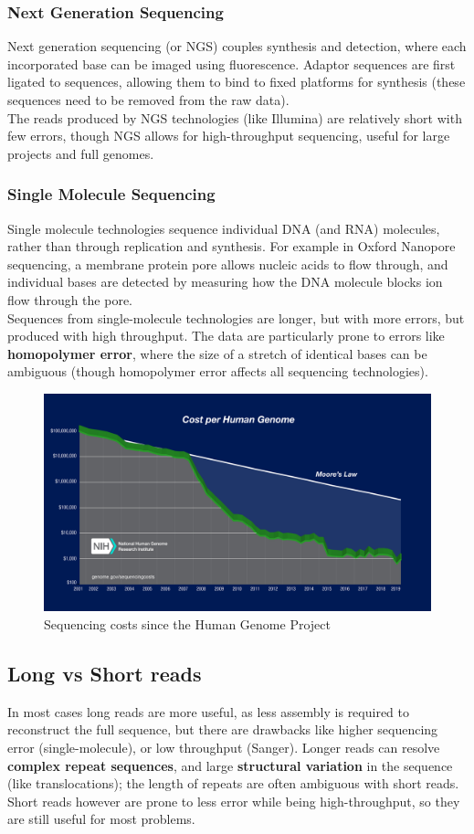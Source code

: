 \documentclass[12pt]{article}
\begin{document}
\subsubsection{Next Generation Sequencing}
Next generation sequencing (or NGS) couples synthesis and detection, where each incorporated base can be imaged using fluorescence. Adaptor sequences are first ligated to sequences, allowing them to bind to fixed platforms for synthesis (these sequences need to be removed from the raw data).\\[10pt]
The reads produced by NGS technologies (like Illumina) are relatively short with few errors, though NGS allows for high-throughput sequencing, useful for large projects and full genomes.

\subsubsection{Single Molecule Sequencing}
Single molecule technologies sequence individual DNA (and RNA) molecules, rather than through replication and synthesis. For example in Oxford Nanopore sequencing, a membrane protein pore allows nucleic acids to flow through, and individual bases are detected by measuring how the DNA molecule blocks ion flow through the pore.\\[10pt]
Sequences from single-molecule technologies are longer, but with more errors, but produced with high throughput. The data are particularly prone to errors like \textbf{homopolymer error}, where the size of a stretch of identical bases can be ambiguous (though homopolymer error affects all sequencing technologies).

\begin{figure}
    \centering
    \includegraphics[width=.8\linewidth]{Sequencing_Cost_per_Genome_August2019.jpg}
    \caption{Sequencing costs since the Human Genome Project}
    \label{fig:seq}
\end{figure}
\subsection{Long vs Short reads}
In most cases long reads are more useful, as less assembly is required to reconstruct the full sequence, but there are drawbacks like higher sequencing error (single-molecule), or low throughput (Sanger). Longer reads can resolve \textbf{complex repeat sequences}, and large \textbf{structural variation} in the sequence (like translocations); the length of repeats are often ambiguous with short reads. Short reads however are prone to less error while being high-throughput, so they are still useful for most problems.
\end{document}
